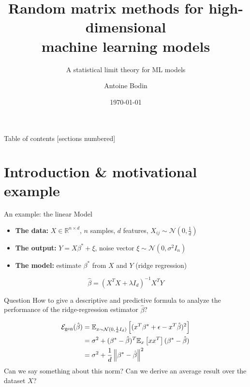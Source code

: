 \documentclass[10pt]{beamer}
\title{Random matrix methods for high-dimensional\\ machine learning models}
\subtitle{A statistical limit theory for ML models}
\date{\today}
\author{Antoine Bodin}
\institute{EPFL}
\begin{document}
\maketitle

\begin{frame}{Table of contents}
  [sections numbered]
  \tableofcontents[hideallsubsections]
\end{frame}

\section{Introduction \& motivational example}


\begin{frame}{An example: the linear Model}
  \begin{itemize}
    \item \textbf{The data:} $X \in \mathbb R^{n \times d}$, $n$ samples, $d$ features, $X_{ij} \sim \mathcal N(0, \frac{1}{d})$
    \item \textbf{The output:} $Y = X \beta^* + \xi$, noise vector $\xi \sim \mathcal N(0, \sigma^2 I_n)$
    \item \textbf{The model:} estimate $\beta^*$ from $X$ and $Y$ (ridge regression)
  \end{itemize}
  \begin{equation}
    \hat \beta = (X^T X + \lambda I_d)^{-1} X^T Y
  \end{equation}

  \begin{alertblock}{Question}
    How to give a descriptive and predictive formula to analyze the performance of the ridge-regression estimator $\hat \beta$?
  \end{alertblock}
  \vspace{-0.8cm}
  \begin{align}
    \mathcal E_{\text{gen}}(\hat \beta) & = \mathbb E_{x \sim \mathcal N(0, \frac{1}{d}I_d)} \left[ ( x^T \beta^* + \epsilon - x^T \hat \beta )^2 \right]\\
    & = \sigma^2 + (\beta^* - \hat \beta)^T \mathbb E_x \left[ x x^T \right] (\beta^* - \hat \beta)\\
    & = \sigma^2 + \frac{1}{d} \left\lVert\beta^* - \hat \beta\right\rVert^2
  \end{align}
  Can we say something about this norm? Can we derive an average result over the dataset $X$?

\end{frame}
\end{document}
